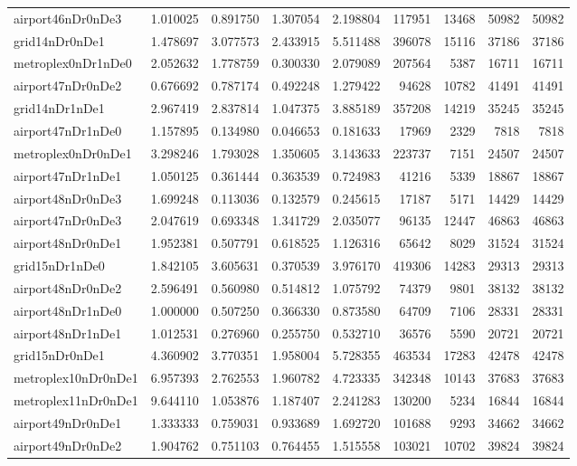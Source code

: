 \begin{longtable}{|l|r|r|r|r|r|r|r|r|}
airport46nDr0nDe3 & 1.010025 & 0.891750 & 1.307054 & 2.198804 & 117951 & 13468 & 50982 & 50982 \\
grid14nDr0nDe1 & 1.478697 & 3.077573 & 2.433915 & 5.511488 & 396078 & 15116 & 37186 & 37186 \\
metroplex0nDr1nDe0 & 2.052632 & 1.778759 & 0.300330 & 2.079089 & 207564 & 5387 & 16711 & 16711 \\
airport47nDr0nDe2 & 0.676692 & 0.787174 & 0.492248 & 1.279422 & 94628 & 10782 & 41491 & 41491 \\
grid14nDr1nDe1 & 2.967419 & 2.837814 & 1.047375 & 3.885189 & 357208 & 14219 & 35245 & 35245 \\
airport47nDr1nDe0 & 1.157895 & 0.134980 & 0.046653 & 0.181633 & 17969 & 2329 & 7818 & 7818 \\
metroplex0nDr0nDe1 & 3.298246 & 1.793028 & 1.350605 & 3.143633 & 223737 & 7151 & 24507 & 24507 \\
airport47nDr1nDe1 & 1.050125 & 0.361444 & 0.363539 & 0.724983 & 41216 & 5339 & 18867 & 18867 \\
airport48nDr0nDe3 & 1.699248 & 0.113036 & 0.132579 & 0.245615 & 17187 & 5171 & 14429 & 14429 \\
airport47nDr0nDe3 & 2.047619 & 0.693348 & 1.341729 & 2.035077 & 96135 & 12447 & 46863 & 46863 \\
airport48nDr0nDe1 & 1.952381 & 0.507791 & 0.618525 & 1.126316 & 65642 & 8029 & 31524 & 31524 \\
grid15nDr1nDe0 & 1.842105 & 3.605631 & 0.370539 & 3.976170 & 419306 & 14283 & 29313 & 29313 \\
airport48nDr0nDe2 & 2.596491 & 0.560980 & 0.514812 & 1.075792 & 74379 & 9801 & 38132 & 38132 \\
airport48nDr1nDe0 & 1.000000 & 0.507250 & 0.366330 & 0.873580 & 64709 & 7106 & 28331 & 28331 \\
airport48nDr1nDe1 & 1.012531 & 0.276960 & 0.255750 & 0.532710 & 36576 & 5590 & 20721 & 20721 \\
grid15nDr0nDe1 & 4.360902 & 3.770351 & 1.958004 & 5.728355 & 463534 & 17283 & 42478 & 42478 \\
metroplex10nDr0nDe1 & 6.957393 & 2.762553 & 1.960782 & 4.723335 & 342348 & 10143 & 37683 & 37683 \\
metroplex11nDr0nDe1 & 9.644110 & 1.053876 & 1.187407 & 2.241283 & 130200 & 5234 & 16844 & 16844 \\
airport49nDr0nDe1 & 1.333333 & 0.759031 & 0.933689 & 1.692720 & 101688 & 9293 & 34662 & 34662 \\
airport49nDr0nDe2 & 1.904762 & 0.751103 & 0.764455 & 1.515558 & 103021 & 10702 & 39824 & 39824 \\

\end{longtable}
